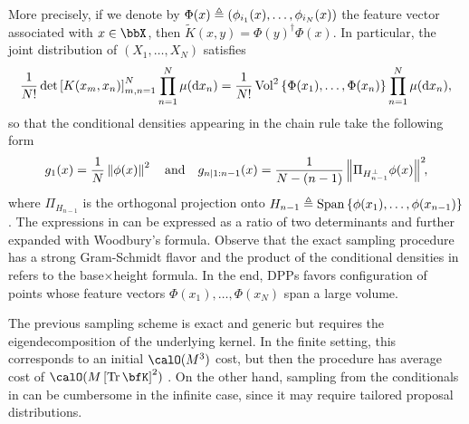 \documentclass[twoside,11pt]{article}
\begin{document}
      More precisely, if we denote by $\Phi(x) \triangleq \left( \phi_{i_1}(x),\dots,\phi_{i_N}(x) \right)$ the feature vector associated with $x\in\bbX$, then $\tilde{K}(x,y) = \Phi(y)^{\dagger} \Phi(x)$.
      In particular, the joint distribution of $(X_1,\dots,X_N)$ satisfies
      \begin{equation*}
      \label{eq:joint_distribution}
        \frac{1}{N!} \det \left[ K(x_m,x_n) \right]_{m,n=1}^N \prod_{n=1}^N\mu(\mathop{}\!\mathrm{d} x_n)
          = \frac{1}{N!} \operatorname{Vol}^2\left\{ \Phi(x_1),\dots,\Phi(x_n) \right\} \prod_{n=1}^N\mu(\mathop{}\!\mathrm{d} x_n),
      \end{equation*}
      so that the conditional densities appearing in the chain rule take the following form
      \begin{equation}
      \label{eq:conditionals_densities}
        g_1(x)
          = \frac{1}{N} \left\| \phi(x) \right\|^2
          \quad\text{and}\quad
        g_{n | 1:n-1}(x)
          = \frac{1}{N-(n-1)} \left\|  \Pi_{H_{n-1}^{\perp}} \phi(x) \right\|^2\!\!,
      \end{equation}
      where $\Pi_{H_{n-1}}$ is the orthogonal projection onto
      $H_{n-1} \triangleq \operatorname{Span}\left\{ \phi(x_1), \dots, \phi(x_{n-1})  \right\}$.
      The expressions in  can be expressed as a ratio of two determinants and further expanded with Woodbury's formula.
      Observe that the exact sampling procedure has a strong Gram-Schmidt flavor and the product of the conditional densities in  refers to the base$\times$height formula.
      In the end, DPPs favors configuration of points whose feature vectors $\Phi(x_1),\dots, \Phi(x_N)$ span a large volume.

      The previous sampling scheme is exact and generic but requires the eigendecomposition of the underlying kernel.
      In the finite setting, this corresponds to an initial $\calO(M^3)$ cost, but then the procedure has average cost of $\calO(M\lrb{\Tr \bfK}^2)$
      \citep{TrBaAm18}.
      On the other hand, sampling from the conditionals in  can be cumbersome in the infinite case, since it may require tailored proposal distributions.
\end{document}
